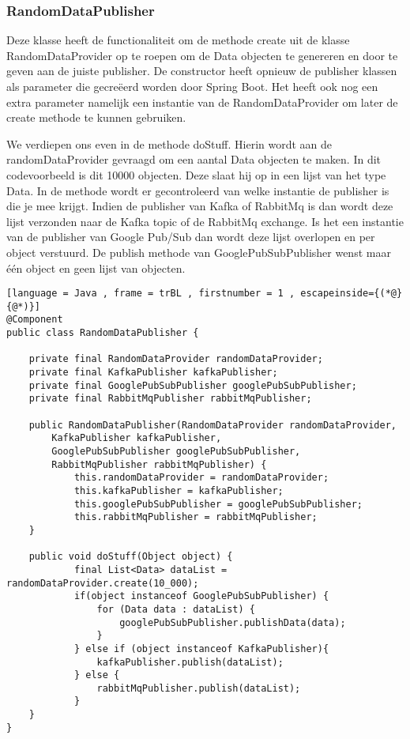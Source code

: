 \subsubsection{RandomDataPublisher}
Deze klasse heeft de functionaliteit om de methode create uit de klasse RandomDataProvider op te roepen om de Data objecten te genereren en door te geven aan de juiste publisher. De constructor heeft opnieuw de publisher klassen als parameter die gecreëerd worden door Spring Boot. Het heeft ook nog een extra parameter namelijk een instantie van de RandomDataProvider om later de create methode te kunnen gebruiken.

We verdiepen ons even in de methode doStuff. Hierin wordt aan de randomDataProvider gevraagd om een aantal Data objecten te maken. In dit codevoorbeeld is dit 10000 objecten. Deze slaat hij op in een lijst van het type Data. In de methode wordt er gecontroleerd van welke instantie de publisher is die je mee krijgt. Indien de publisher van Kafka of RabbitMq is dan wordt deze lijst verzonden naar de Kafka topic of de RabbitMq exchange. Is het een instantie van de publisher van Google Pub/Sub dan wordt deze lijst overlopen en per object verstuurd. De publish methode van GooglePubSubPublisher wenst maar één object en geen lijst van objecten.

\begin{lstlisting}[language = Java , frame = trBL , firstnumber = 1 , escapeinside={(*@}{@*)}]
@Component
public class RandomDataPublisher {

    private final RandomDataProvider randomDataProvider;
    private final KafkaPublisher kafkaPublisher;
    private final GooglePubSubPublisher googlePubSubPublisher;
    private final RabbitMqPublisher rabbitMqPublisher;

    public RandomDataPublisher(RandomDataProvider randomDataProvider,
        KafkaPublisher kafkaPublisher,
        GooglePubSubPublisher googlePubSubPublisher,
        RabbitMqPublisher rabbitMqPublisher) {
            this.randomDataProvider = randomDataProvider;
            this.kafkaPublisher = kafkaPublisher;
            this.googlePubSubPublisher = googlePubSubPublisher;
            this.rabbitMqPublisher = rabbitMqPublisher;
    }

    public void doStuff(Object object) {
            final List<Data> dataList = randomDataProvider.create(10_000);
            if(object instanceof GooglePubSubPublisher) {
                for (Data data : dataList) {
                    googlePubSubPublisher.publishData(data);
                }
            } else if (object instanceof KafkaPublisher){
                kafkaPublisher.publish(dataList);
            } else {
                rabbitMqPublisher.publish(dataList);
            }
    }
}
\end{lstlisting}
